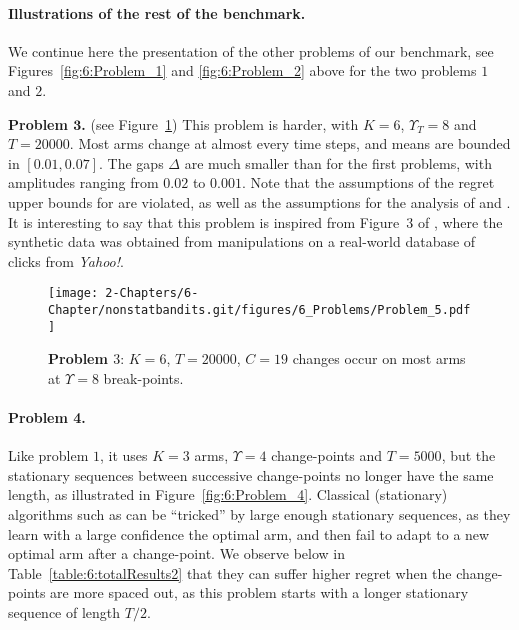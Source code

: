 \paragraph{Illustrations of the rest of the benchmark.}\label{par:6:benchmark2}

We continue here the presentation of the other problems of our benchmark, see Figures~\ref{fig:6:Problem_1} and \ref{fig:6:Problem_2} above for the two problems $1$ and $2$.

\textbf{Problem $\bm 3$.} (see Figure~\ref{fig:6:Problem_5}) This problem is harder, with $K=6$, $\Upsilon_T=8$ and $T=20000$.
Most arms change at almost every time steps,
and means are bounded in $[0.01, 0.07]$.
The gaps $\Delta$ are much smaller than for the first problems, with amplitudes ranging from $0.02$ to $0.001$.
Note that the assumptions of the regret upper bounds for \GLRklUCB{} are violated, as well as the assumptions for the analysis of \MUCB{} and \CUSUMUCB.
It is interesting to say that this problem is inspired from Figure~3 of \cite{CaoZhenKvetonXie18}, where the synthetic data was obtained from manipulations on a real-world database of clicks from \emph{Yahoo!}.

\begin{figure}[h!]  %
    \centering
    \texttt{[image: 2-Chapters/6-Chapter/nonstatbandits.git/figures/6\_Problems/Problem\_5.pdf]}
    \caption{\textbf{Problem $3$}: $K=6$, $T=20000$, $C=19$ changes occur on most arms at $\Upsilon=8$ break-points.}
    \label{fig:6:Problem_5}
\end{figure}


\paragraph{Problem 4.}

Like problem $1$, it uses $K=3$ arms, $\Upsilon=4$ change-points and $T=5000$,
but the stationary sequences between successive change-points no longer have the same length, as illustrated in Figure~\ref{fig:6:Problem_4}.
Classical (stationary) algorithms such as \klUCB{} can be ``tricked'' by large enough stationary sequences, as they learn with a large confidence the optimal arm, and then fail to adapt to a new optimal arm after a change-point.
We observe below in Table~\ref{table:6:totalResults2} that they can suffer higher regret when the change-points are more spaced out, as this problem starts with a longer stationary sequence of length $T/2$.

